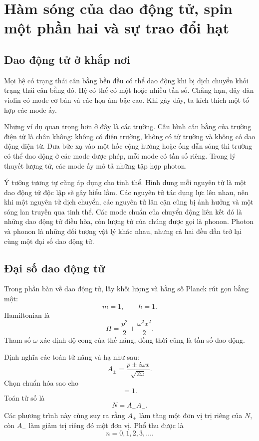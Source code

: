 \chapter{Hàm sóng của dao động tử, spin một phần hai và sự trao đổi hạt}

\section{Dao động tử ở khắp nơi}

Mọi hệ có trạng thái cân bằng bền đều có thể dao động khi bị dịch chuyển khỏi trạng thái cân bằng đó. Hệ có thể có một hoặc nhiều tần số. Chẳng hạn, dây đàn violin có mode cơ bản và các họa âm bậc cao. Khi gảy dây, ta kích thích một tổ hợp các mode ấy.

Những ví dụ quan trọng hơn ở đây là các trường. Cấu hình cân bằng của trường điện từ là chân không: không có điện trường, không có từ trường và không có dao động điện từ. Đưa bức xạ vào một hốc cộng hưởng hoặc ống dẫn sóng thì trường có thể dao động ở các mode được phép, mỗi mode có tần số riêng. Trong lý thuyết lượng tử, các mode ấy mô tả những tập hợp photon.

Ý tưởng tương tự cũng áp dụng cho tinh thể. Hình dung mỗi nguyên tử là một dao động tử độc lập sẽ gây hiểu lầm. Các nguyên tử tác dụng lực lên nhau, nên khi một nguyên tử dịch chuyển, các nguyên tử lân cận cũng bị ảnh hưởng và một sóng lan truyền qua tinh thể. Các mode chuẩn của chuyển động liên kết đó là những dao động tử điều hòa, còn lượng tử của chúng được gọi là phonon. Photon và phonon là những đối tượng vật lý khác nhau, nhưng cả hai đều dẫn trở lại cùng một đại số dao động tử.

\section{Đại số dao động tử}

Trong phần bàn về dao động tử, lấy khối lượng và hằng số Planck rút gọn bằng một:
\[
m=1,\qquad \hbar=1.
\]
Hamiltonian là
\begin{equation}
H=\frac{p^{2}}{2}+\frac{\omega^{2}x^{2}}{2}.
\end{equation}
Tham số \(\omega\) xác định độ cong của thế năng, đồng thời cũng là tần số dao động.

Định nghĩa các toán tử nâng và hạ như sau:
\begin{equation}
A_{\pm}=\frac{p\pm i\omega x}{\sqrt{2\omega}}.
\end{equation}
Chọn chuẩn hóa sao cho
\begin{equation}
[A_{-},A_{+}]=1.
\end{equation}
Toán tử số là
\begin{equation}
N=A_{+}A_{-}.
\end{equation}
Các phương trình này cùng suy ra rằng \(A_{+}\) làm tăng một đơn vị trị riêng của \(N\), còn \(A_{-}\) làm giảm trị riêng đó một đơn vị. Phổ thu được là
\begin{equation}
n=0,1,2,3,\ldots .
\end{equation}


